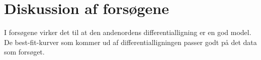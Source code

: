 \section{Diskussion af forsøgene}
I forsøgene virker det til at den andenordens differentialligning er en god model. 
De best-fit-kurver som kommer ud af differentialligningen passer godt på det data som forsøget.